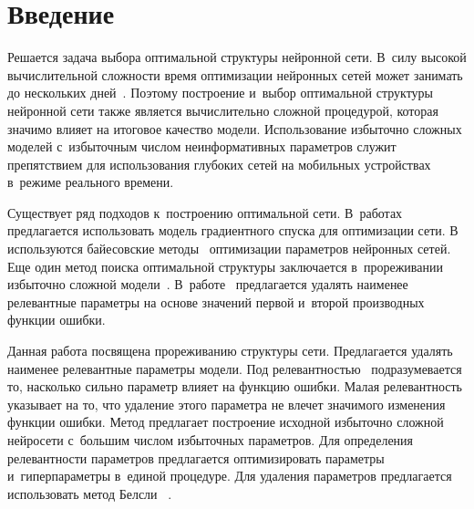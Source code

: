 
  



\thispagestyle{headings}

\begin{multicols}{2}

\label{st\stat}


\section{Введение}

Решается задача выбора оптимальной структуры нейронной сети. В~силу высокой 
вычислительной сложности время оптимизации нейронных сетей может занимать до 
нескольких дней~\cite{sutskever2014}. Поэтому по\-стро\-ение и~выбор оптимальной 
структуры нейронной сети так\-же является вычислительно слож\-ной процедурой, 
которая значимо влияет на итоговое качество модели. Использование избыточно 
слож\-ных моделей с~избыточным чис\-лом неинформативных параметров служит 
препятствием для использования глубоких сетей на мобильных устройствах в~режиме 
реального времени.

Существует ряд подходов к~построению оптимальной сети. 
В~работах~\cite{maclarin2015, luketina2015} предлагается ис\-пользовать модель 
градиентного спуска для оптимизации сети. В~\cite{molchanov2017} используются 
байесовские методы~\cite{neal1995} оптимизации па\-ра\-мет\-ров нейронных сетей.  Еще 
один метод поиска оптимальной структуры за\-клю\-ча\-ет\-ся в~прореживании избыточно 
слож\-ной модели~\cite{cun1990, louizos2017, graves2011}. В~работе~\cite{cun1990} 
предлагается\linebreak
 удалять наименее релевантные па\-ра\-мет\-ры на основе значений первой 
и~второй производных функции \mbox{ошибки}.

Данная работа посвящена прореживанию структуры сети. Предлагается удалять 
наименее релевантные па\-ра\-мет\-ры модели. Под ре\-ле\-вант\-ностью~\cite{cun1990} 
подразумевается то, насколько сильно параметр влияет на функцию ошиб\-ки. Малая 
ре\-ле\-вант\-ность указывает на то, что удаление этого па\-ра\-мет\-ра не влечет значимого 
изменения функции ошиб\-ки. Метод предлагает по\-стро\-ение исходной избыточно сложной 
нейросети с~большим числом избыточных па\-ра\-мет\-ров. Для определения ре\-ле\-вант\-ности 
па\-ра\-мет\-ров предлагается оптимизировать параметры и~гиперпараметры в~единой 
процедуре. Для удаления па\-ра\-мет\-ров предлагается использовать метод 
Белсли~\cite{neychev2016} .


\end{multicols}
